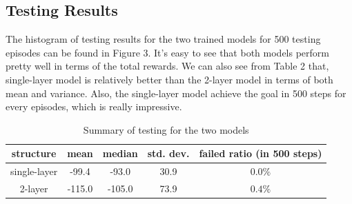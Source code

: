 \documentclass[11pt]{article}
\begin{document}
\subsection{Testing Results}

The histogram of testing results for the two trained models for 500 testing episodes can be found in Figure 3. It's easy to see that both models perform pretty well in terms of the total rewards. We can also see from Table 2 that, single-layer model is relatively better than the 2-layer model in terms of both mean and variance. Also, the single-layer model achieve the goal in 500 steps for every episodes, which is really impressive.


\begin{table}[h]
\begin{center}
\vspace{1mm}
\begin{tabular}{ccccc}
\hline
 \hline
structure & mean &  median   & std. dev. & failed ratio (in 500 steps)  \\
 \hline 
single-layer & -99.4 & -93.0 & 30.9 & $0.0\%$  \\
2-layer & -115.0 & -105.0 & 73.9 & $0.4\%$  \\
 \hline
 \hline
\end{tabular}
\end{center}
\vspace{-1em}
\caption{Summary of testing for the two models}
\end{table}
\end{document}
